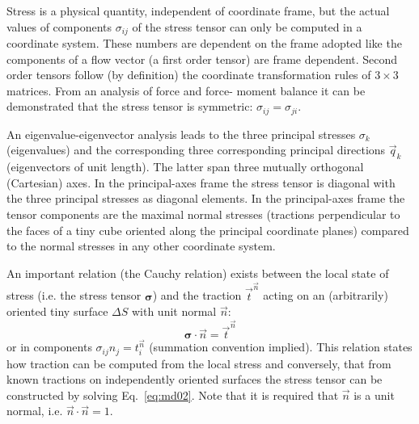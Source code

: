 Stress is a physical quantity, independent of coordinate frame, but the actual values of
components $\sigma_{ij}$ of the stress tensor can only be computed in 
a coordinate system. These
numbers are dependent on the frame adopted like the components of a flow vector (a first
order tensor) are frame dependent. Second order tensors follow (by definition) the
coordinate transformation rules of $3 \times 3$ matrices. From an analysis of force and force-
moment balance it can be demonstrated that the stress tensor is symmetric: $\sigma_{ij}=\sigma_{ji}$. 

An eigenvalue-eigenvector analysis leads to the three principal stresses $\sigma_k$ (eigenvalues) and
the corresponding three corresponding principal directions $\vec{q}_k$ (eigenvectors of unit
length). The latter span three mutually orthogonal (Cartesian) axes. In the principal-axes
frame the stress tensor is diagonal with the three principal stresses as diagonal elements.
In the principal-axes frame the tensor components are the maximal normal stresses
(tractions perpendicular to the faces of a tiny cube oriented along the principal coordinate
planes) compared to the normal stresses in any other coordinate system.


An important relation (the Cauchy relation) exists between the local state of stress (i.e.
the stress tensor ${\bm \sigma}$) 
and the traction $\vec{t}^{\vec n}$  acting on 
an (arbitrarily) oriented tiny surface $\Delta S$
with unit normal $\vec{n}$:
\begin{equation}
{\bm \sigma} \cdot \vec{n} = \vec{t}^{\vec n}
\label{eq:md02}
\end{equation}
or in components $\sigma_{ij} n_j = t_i^{\vec n}$ (summation convention implied).
This relation states how traction can be computed from the local stress and conversely,
that from known tractions on independently oriented surfaces the stress tensor can be
constructed by solving Eq.~\eqref{eq:md02}.
Note that it is required that $\vec{n}$ is a unit normal, i.e. $\vec{n}\cdot\vec{n}=1$.

\vspace{0.5cm}
\vspace{0.5cm}

